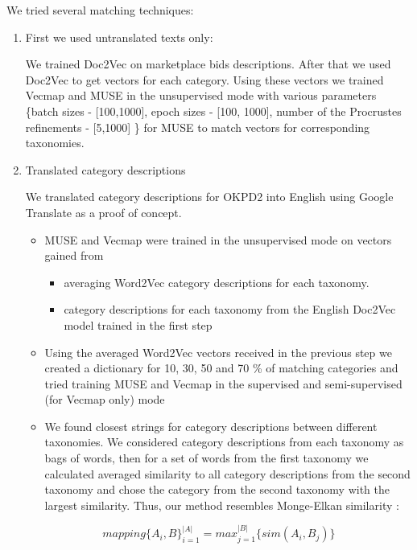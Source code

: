 \documentclass[conference]{IEEEtran}
\begin{document}
We tried several matching techniques:
\begin{enumerate}
\item First we used untranslated texts only:

We trained Doc2Vec on marketplace bids descriptions. After that we used Doc2Vec to get vectors for each category. Using these vectors we trained Vecmap and MUSE in the unsupervised mode with various parameters \{batch sizes - [100,1000], epoch sizes - [100, 1000], number of the Procrustes refinements - [5,1000] \} for MUSE to match vectors for corresponding taxonomies.

\item Translated category descriptions

We translated category descriptions for OKPD2 into English using Google Translate as a proof of concept.
\begin{itemize}
\item MUSE and Vecmap were trained in the unsupervised mode on vectors gained from \begin{itemize}
    \item averaging Word2Vec category descriptions for each taxonomy.
    \item category descriptions for each taxonomy from the English Doc2Vec model trained in the first step
    \end{itemize}
\item Using the averaged Word2Vec vectors received in the previous step we created a dictionary for 10, 30, 50 and 70 \% of matching categories and tried training MUSE and Vecmap in the supervised and semi-supervised (for Vecmap only) mode
\item We found closest strings for category descriptions between different taxonomies. We considered category descriptions from each taxonomy as bags of words, then for a set of words from the first taxonomy we calculated averaged similarity to all category descriptions from the second taxonomy and chose the category from the second taxonomy with the largest similarity. Thus, our method resembles Monge-Elkan similarity \cite[p.~111]{dupe-detect}:
\end{itemize}

$$mapping\{A_i, B\}_{i=1}^{|A|} = max_{j=1}^{|B|}\{sim(A_i,B_j)\}$$


\end{enumerate}
\end{document}
